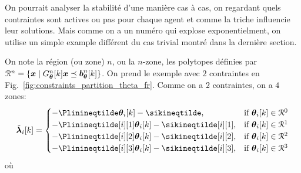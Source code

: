 \documentclass[../main.tex]{subfiles}
\begin{document}
On pourrait analyser la stabilité d'une manière cas à cas, on regardant quels contraintes sont actives ou pas pour chaque agent et comme la triche influencie leur solutions.
Mais comme on a un numéro qui explose exponentielment, on utilise un simple example différent du cas trivial montré dans la dernière section.

On note la région (ou zone) $n$, ou la $n$-zone, les polytopes définies par ${\mathcal{R}^{n}=\{\boldsymbol{x}\mid G_{\boldsymbol{\theta}}^{n}[k]\boldsymbol{x} \preceq \boldsymbol{b}_{\boldsymbol{\theta}}^{n}[k]\}}$.
On prend le exemple avec $2$ contraintes en Fig.~\ref{fig:constraints_partition_theta_fr}.
Comme on a $2$ contraintes, on a $4$ zones:
\begin{equation}
  \lambdaicheat[k]=
  \begin{cases}
    -\Plinineqtilde      \thetaik-\sikineqtilde      ,&\text{if }\thetaik\in\set{R}^{0}\\
    -\Plinineqtilde[i][1]\thetaik-\sikineqtilde[i][1],&\text{if }\thetaik\in\set{R}^{1}\\
    -\Plinineqtilde[i][2]\thetaik-\sikineqtilde[i][2],&\text{if }\thetaik\in\set{R}^{2}\\
    -\Plinineqtilde[i][3]\thetaik-\sikineqtilde[i][3],&\text{if }\thetaik\in\set{R}^{3}\\
  \end{cases}\label{eq:1}
\end{equation}
où
\end{document}
